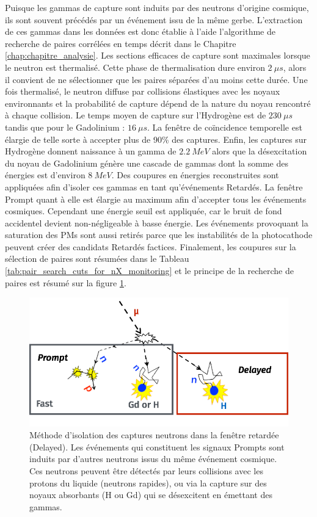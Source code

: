 Puisque les gammas de capture sont induits par des neutrons d'origine cosmique, ils sont souvent précédés par un événement issu de la même gerbe. L'extraction de ces gammas dans les données est donc établie à l'aide l'algorithme de recherche de paires corrélées en temps décrit dans le Chapitre \ref{chap:chapitre_analysie}. Les sections efficaces de capture sont maximales lorsque le neutron est thermalisé. Cette phase de thermalisation dure environ $\SI{2}{\mu s}$, alors il convient de ne sélectionner que les paires séparées d'au moins cette durée. Une fois thermalisé, le neutron diffuse par collisions élastiques avec les noyaux environnants et la probabilité de capture dépend de la nature du noyau rencontré à chaque collision. Le temps moyen de capture sur l'Hydrogène est de $\SI{230}{\mu s}$ tandis que pour le Gadolinium : $\SI{16}{\mu s}$. La fenêtre de coïncidence temporelle est élargie de telle sorte à accepter plus de 90\% des captures. Enfin, les captures sur Hydrogène donnent naissance à un gamma de $\SI{2.2}{MeV}$ alors que la désexcitation du noyau de Gadolinium génère une cascade de gammas dont la somme des énergies est d'environ $\SI{8}{MeV}$. Des coupures en énergies reconstruites sont appliquées afin d'isoler ces gammas en tant qu'événements Retardés. La fenêtre Prompt quant à elle est élargie au maximum afin d'accepter tous les événements cosmiques. Cependant une énergie seuil est appliquée, car le bruit de fond accidentel devient non-négligeable à basse énergie. Les événements provoquant la saturation des PMs sont aussi retirés parce que les instabilités de la photocathode peuvent créer des candidats Retardés factices. Finalement, les coupures sur la sélection de paires sont résumées dans le Tableau \ref{tab:pair_search_cuts_for_nX_monitoring} et le principe de la recherche de paires est résumé sur la figure \ref{fig:Hcapture}.\\

\begin{figure}[h!]
  \centering
  \includegraphics[width=0.8\linewidth]{images/Hcapture}
  \caption[Méthode d'isolation des captures neutrons dans la fenêtre retardée]{Méthode d'isolation des captures neutrons dans la fenêtre retardée (Delayed). Les événements qui constituent les signaux Prompts sont induits par d'autres neutrons issus du même événement cosmique. Ces neutrons peuvent être détectés par leurs collisions avec les protons du liquide (neutrons rapides), ou via la capture sur des noyaux absorbants (H ou Gd) qui se désexcitent en émettant des gammas.}
  \label{fig:Hcapture}
\end{figure}

